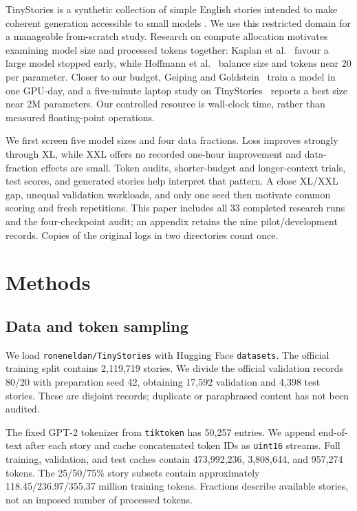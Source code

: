 \documentclass[10pt,twocolumn,letterpaper]{article}
\begin{document}
TinyStories is a synthetic collection of simple English stories intended to make
coherent generation accessible to small models \citep{tinystories2023}. We use
this restricted domain for a manageable from-scratch study. Research on compute
allocation motivates examining model size and processed tokens together: Kaplan et
al.~\citep{kaplan2020} favour a large model stopped early, while Hoffmann et
al.~\citep{hoffmann2022} balance size and tokens near 20 per parameter. Closer to our
budget, Geiping and Goldstein~\citep{geiping2023} train a model in one GPU-day, and a
five-minute laptop study on TinyStories~\citep{goedecke} reports a best size near 2M
parameters. Our controlled resource is wall-clock time, rather than measured
floating-point operations.

We first screen five model sizes and four data fractions. Loss improves strongly
through XL, while XXL offers no recorded one-hour improvement and data-fraction
effects are small. Token audits, shorter-budget and longer-context trials, test
scores, and generated stories help interpret that pattern. A close XL/XXL gap,
unequal validation workloads, and only one seed then motivate common scoring and
fresh repetitions. This paper includes all 33 completed research runs and the
four-checkpoint audit; an appendix retains the nine pilot/development records.
Copies of the original logs in two directories count once.

\section{Methods}

\subsection{Data and token sampling}

We load \texttt{roneneldan/TinyStories} with Hugging Face \texttt{datasets}.
The official training split contains 2,119,719 stories. We divide the official
validation records 80/20 with preparation seed 42, obtaining 17,592 validation
and 4,398 test stories. These are disjoint records; duplicate or paraphrased
content has not been audited.

The fixed GPT-2 tokenizer from \texttt{tiktoken} has 50,257 entries. We append
end-of-text after each story and cache concatenated token IDs as \texttt{uint16}
streams. Full training, validation, and test caches contain 473,992,236,
3,808,644, and 957,274 tokens. The 25/50/75\% story subsets contain approximately
118.45/236.97/355.37 million training tokens. Fractions describe available
stories, not an imposed number of processed tokens.
\end{document}
